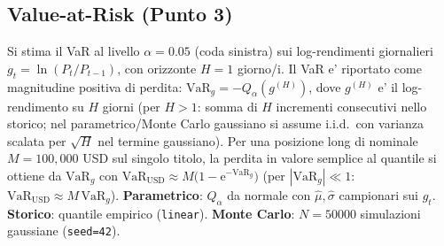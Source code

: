 
\subsection*{Value-at-Risk (Punto 3)}
Si stima il VaR al livello $\alpha=0.05$ (coda sinistra) sui log-rendimenti giornalieri
$g_t=\ln(P_t/P_{t-1})$, con orizzonte $H=1$ giorno/i.
Il VaR e' riportato come magnitudine positiva di perdita: $\mathrm{VaR}_g=-Q_\alpha(g^{(H)})$,
dove $g^{(H)}$ e' il log-rendimento su $H$ giorni (per $H>1$: somma di $H$ incrementi consecutivi nello storico; nel parametrico/Monte Carlo gaussiano si assume i.i.d.\ con varianza scalata per $\sqrt{H}$ nel termine gaussiano).
Per una posizione long di nominale $M=100,000$ USD sul singolo titolo,
la perdita in valore semplice al quantile si ottiene da $\mathrm{VaR}_g$ con
$\mathrm{VaR}_{\mathrm{USD}}\approx M\bigl(1-\mathrm{e}^{-\mathrm{VaR}_g}\bigr)$
(per $|\mathrm{VaR}_g|\ll 1$: $\mathrm{VaR}_{\mathrm{USD}}\approx M\,\mathrm{VaR}_g$).
\textbf{Parametrico}: $Q_\alpha$ da normale con $\hat\mu,\hat\sigma$ campionari sui $g_t$.
\textbf{Storico}: quantile empirico (\texttt{linear}).
\textbf{Monte Carlo}: $N=50000$ simulazioni gaussiane (\texttt{seed=42}).
